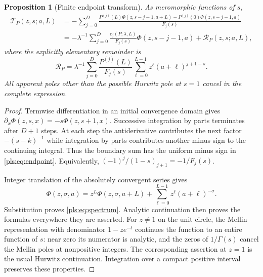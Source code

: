 \documentclass[11pt,letterpaper]{article}
\numberwithin{equation}{section}
\newtheorem{proposition}[theorem]{Proposition}
\theoremstyle{definition}
\theoremstyle{remark}\newtheorem{remark}[theorem]{Remark}
\newcommand{\T}{\mathcal T}
\begin{document}
\begin{proposition}[Finite endpoint transform]\label{pls:prop:endpoint}
As meromorphic functions of $s$,
\begin{align}
 \T_P(z,s;a,L)
 &=-\sum_{j=0}^D\frac{P^{(j)}(L)\Phi(z,s-j-1,a+L)
                  -P^{(j)}(0)\Phi(z,s-j-1,a)}{F_j(s)}
                  \label{pls:eq:endpoint}\\
 &=-\lambda^{-1}\sum_{j=0}^D
        \frac{c_j(P;\lambda,L)}{F_j(s)}\Phi(z,s-j-1,a)
      +\mathcal R_P(z,s;a,L),\label{pls:eq:spectrum}
\end{align}
where the explicitly elementary remainder is
\begin{equation}\label{pls:eq:remainder}
 \mathcal R_P=\lambda^{-1}\sum_{j=0}^D
     \frac{P^{(j)}(L)}{F_j(s)}
          \sum_{\ell=0}^{L-1}z^\ell(a+\ell)^{j+1-s}.
\end{equation}
All apparent poles other than the possible Hurwitz pole at $s=1$
cancel in the complete expression.
\end{proposition}
\begin{proof}
Termwise differentiation in an initial convergence domain gives
$\partial_x\Phi(z,s,x)=-s\Phi(z,s+1,x)$. Successive integration by
parts terminates after $D+1$ steps. At each step the antiderivative
contributes the next factor $-(s-k)^{-1}$ while integration by parts
contributes another minus sign to the continuing integral. Thus the
boundary sum has the uniform minus sign in
\eqref{pls:eq:endpoint}. Equivalently,
$(-1)^j/(1-s)_{j+1}=-1/F_j(s)$.

Integer translation of the absolutely convergent series gives
\[
 \Phi(z,\sigma,a)=z^L\Phi(z,\sigma,a+L)
                  +\sum_{\ell=0}^{L-1}z^\ell(a+\ell)^{-\sigma}.
\]
Substitution proves \eqref{pls:eq:spectrum}. Analytic continuation
then proves the formulas everywhere they are asserted. For $z\ne1$
on the unit circle, the Mellin representation with denominator
$1-ze^{-t}$ continues the function to an entire function of $s$:
near zero its numerator is analytic, and the zeros of $1/\Gamma(s)$
cancel the Mellin poles at nonpositive integers. The corresponding
assertion at $z=1$ is the usual Hurwitz continuation. Integration over
a compact positive interval preserves these properties.
\end{proof}
\end{document}
